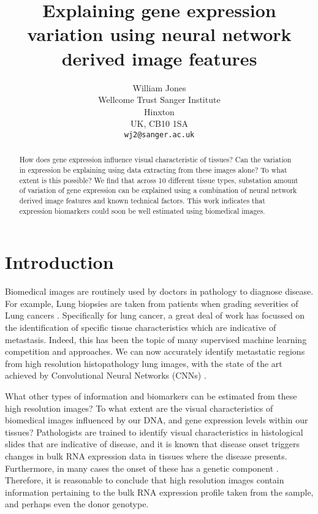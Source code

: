\documentclass{article}
\title{Explaining gene expression variation using neural network derived image features}
\author{
  William Jones\\
  Wellcome Trust Sanger Institute\\
  Hinxton\\
  UK, CB10 1SA \\
  \texttt{wj2@sanger.ac.uk} \\
}
\begin{document}

\maketitle

\begin{abstract}
How does gene expression influence visual characteristic of tissues? Can the variation in expression be explaining using data extracting from these images alone? To what extent is this possible? We find that across 10 different tissue types, substation amount of variation of gene expression can be explained using a combination of neural network derived image features and known technical factors. This work indicates that expression biomarkers could soon be well estimated using biomedical images. \end{abstract}

\section{Introduction}
Biomedical images are routinely used by doctors in pathology to diagnose disease. For example, Lung biopsies are taken from patients when grading severities of Lung cancers \cite{histology-classification-lung-cancer}. Specifically for lung cancer, a great deal of work has focussed on the identification of specific tissue characteristics which are indicative of metastasis. Indeed, this has been the topic of many supervised machine learning competition and approaches. We can now accurately identify metastatic regions from high resolution histopathology lung images, with the state of the art achieved by Convolutional Neural Networks (CNNs) \cite{detecting-cancer-metastases}.

What other types of information and biomarkers can be estimated from these high resolution images? To what extent are the visual characteristics of biomedical images influenced by our DNA, and gene expression levels within our tissues? Pathologists are trained to identify visual characteristics in histological slides that are indicative of disease, and it is known that disease onset triggers changes in bulk RNA expression data in tissues where the disease presents. \cite{gene-expression-parkinsons} Furthermore, in many cases the onset of these has a genetic component \cite{what-is-complex-about-complex-disorders}. Therefore, it is reasonable to conclude that high resolution images contain information pertaining to the bulk RNA expression profile taken from the sample, and perhaps even the donor genotype.
\end{document}
